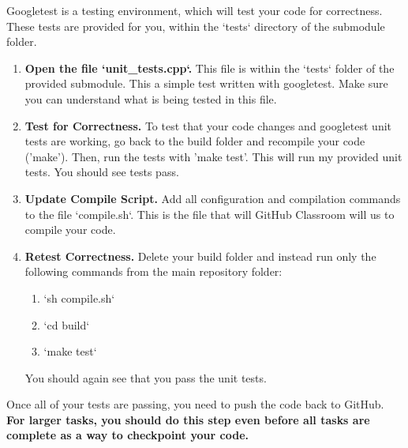 \documentclass{article} %
\begin{document}

Googletest is a testing environment, which will test your code for correctness.  These tests are provided for you, within the `tests` directory of the submodule folder.

\begin{enumerate}
    \item \textbf{Open the file `unit\_tests.cpp`.}  This file is within the `tests` folder of the provided submodule.  This a simple test written with googletest.  Make sure you can understand what is being tested in this file.

    \item \textbf{Test for Correctness.}  To test that your code changes and googletest unit tests are working, go back to the build folder and recompile your code ('make').  Then, run the tests with 'make test'.  This will run my provided unit tests.  You should see tests pass.
    

    \item \textbf{Update Compile Script.}  Add all configuration and compilation commands to the file `compile.sh`.  This is the file that will GitHub Classroom will us to compile your code.

    \item \textbf{Retest Correctness.}  Delete your build folder and instead run only the following commands from the main repository folder:
    \begin{enumerate}
        \item `sh compile.sh`
        \item `cd build`
        \item `make test`
    \end{enumerate}
    You should again see that you pass the unit tests.
\end{enumerate}



Once all of your tests are passing, you need to push the code back to GitHub.  \textbf{For larger tasks, you should do this step even before all tasks are complete as a way to checkpoint your code.}
\end{document}
